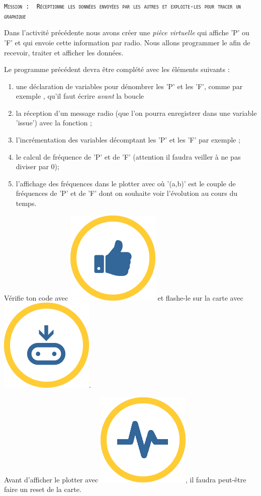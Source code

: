 \begin{eleve}
\texttt{\scshape{Mission : }
Réceptionne les données envoyées par les autres \mb et exploite-les pour tracer un \emph{graphique}}

Dans l'activité précédente nous avons créer une \emph{pièce virtuelle} qui affiche 'P' ou 'F' et qui envoie cette information par radio.
Nous allons programmer le \mb afin de recevoir, traiter et afficher les données. 


Le programme précédent devra être complété avec les éléments suivants :
\begin{enumerate}
    \item une déclaration de variables pour dénombrer les 'P' et les 'F', comme par exemple , qu'il faut écrire \emph{avant} la boucle 
    \item la réception d'un message radio (que l'on pourra enregistrer dans une variable 'issue') avec la fonction  ;
    \item l'incrémentation des variables décomptant les 'P' et les 'F' par exemple  ;
    \item le calcul de fréquence de 'P' et de 'F' (attention il faudra veiller à ne pas diviser par 0);
    \item l'affichage des fréquences dans le plotter avec  où '(a,b)' est le couple de fréquences de 'P' et de 'F' dont on souhaite voir l'évolution au cours du temps.
\end{enumerate}



Vérifie ton code avec   \includegraphics[width=0.1\linewidth]{res/check.png} et flashe-le sur la carte avec \includegraphics[width=0.1\linewidth]{res/flash.png}.

Avant d'afficher le plotter avec \includegraphics[width=0.1\linewidth]{res/plotter.png}, il faudra peut-être faire un reset de la carte.  


\end{eleve}


